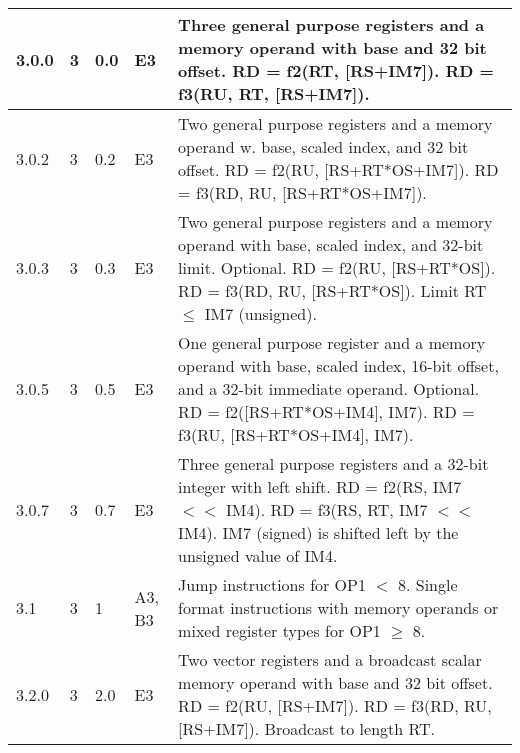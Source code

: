 \documentclass[forwardcom.tex]{subfiles}
\begin{document}
\begin{longtable} {|p{10mm}|p{6mm}|p{9mm}|p{7mm}|p{80mm}|}
\hline
3.0.0 & 3 & 0.0  & E3 & Three general purpose registers and a memory operand with base and 32 bit offset.\newline 
RD = f2(RT, [RS+IM7]). \newline 
RD = f3(RU, RT, [RS+IM7]).\\

\hline
3.0.2 & 3 & 0.2  & E3 & Two general purpose registers and a memory operand w. base, scaled index, and 32 bit offset.\newline 
RD = f2(RU, [RS+RT*OS+IM7]). \newline 
RD = f3(RD, RU, [RS+RT*OS+IM7]). \\

\hline
3.0.3 & 3 & 0.3  & E3 & Two general purpose registers and a memory operand with base, scaled index, and 32-bit limit. Optional. \newline 
RD = f2(RU, [RS+RT*OS]). \newline 
RD = f3(RD, RU, [RS+RT*OS]). \newline 
Limit RT $\leq$ IM7 (unsigned). \\

\hline
3.0.5 & 3 & 0.5  & E3 & One general purpose register and a memory operand with base, scaled index, 16-bit offset, and a 32-bit immediate operand. Optional. \newline 
RD = f2([RS+RT*OS+IM4], IM7). \newline 
RD = f3(RU, [RS+RT*OS+IM4], IM7). \\ 

\hline
3.0.7 & 3 & 0.7  & E3 & Three general purpose registers and a 32-bit integer with left shift.\newline 
RD = f2(RS, IM7 $<<$ IM4). \newline 
RD = f3(RS, RT, IM7 $<<$ IM4). \newline 
IM7 (signed) is shifted left by the unsigned value of IM4. \\

\hline
3.1 & 3 & 1 & A3, B3 & Jump instructions for OP1 $<$ 8. Single format instructions with memory operands or mixed register types for OP1 $\geq$ 8.\\

\hline
3.2.0 & 3 & 2.0 & E3 & Two vector registers and a broadcast scalar memory operand with base and 32 bit offset.\newline 
RD = f2(RU, [RS+IM7]). \newline 
RD = f3(RD, RU, [RS+IM7]). \newline 
Broadcast to length RT.\\


\end{longtable}
\end{document}
